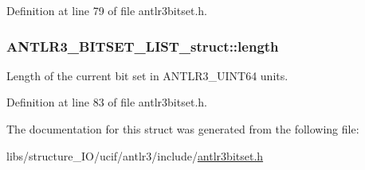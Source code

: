 Definition at line 79 of file antlr3bitset.\-h.

\hypertarget{struct_a_n_t_l_r3___b_i_t_s_e_t___l_i_s_t__struct_a94f5be886e6aa4c19828209409ec6fa3}{
\subsubsection[{length}]{ A\-N\-T\-L\-R3\-\_\-\-B\-I\-T\-S\-E\-T\-\_\-\-L\-I\-S\-T\-\_\-struct\-::length}}\label{struct_a_n_t_l_r3___b_i_t_s_e_t___l_i_s_t__struct_a94f5be886e6aa4c19828209409ec6fa3}
Length of the current bit set in A\-N\-T\-L\-R3\-\_\-\-U\-I\-N\-T64 units. 

Definition at line 83 of file antlr3bitset.\-h.



The documentation for this struct was generated from the following file\-:\begin{DoxyCompactItemize}
\item 
libs/structure\-\_\-\-I\-O/ucif/antlr3/include/\hyperlink{antlr3bitset_8h}{antlr3bitset.\-h}\end{DoxyCompactItemize}
